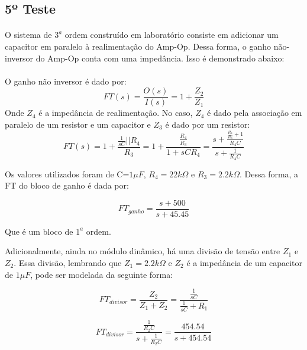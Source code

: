 \subsection{5º Teste}
\paragraph{}
O sistema de $3^a$ ordem construído em laboratório consiste em adicionar um capacitor em paralelo à realimentação do Amp-Op. Dessa forma, o ganho não-inversor do Amp-Op conta com uma impedância. Isso é demonstrado abaixo:

\paragraph{} O ganho não inversor é dado por:\\
\begin{equation}
FT(s)=\frac{O(s)}{I(s)}=1+\frac{Z_2}{Z_1}
\end{equation}
Onde $Z_4$ é a impedância de realimentação.
No caso, $Z_4$ é dado pela associação em paralelo de um resistor e um capacitor e $Z_3$ é dado por um resistor:
\begin{equation}
FT(s)=1+\frac{\frac{1}{sC}||R_4}{R_3}=1+\frac{\frac{R_4}{R_3}}{1+sCR_4}=\frac{s+\frac{\frac{R_4}{R_3}+1}{R_4C}}{s+\frac{1}{R_4C}}
\end{equation}

Os valores utilizados foram de C=$1\mu F$, $R_4=22k\Omega$ e $R_3=2.2k\Omega$. Dessa forma, a FT do bloco de ganho é dada por:

\begin{equation}
FT_{ganho}=\frac{s+500}{s+45.45}
\end{equation}{}

Que é um bloco de $1^a$ ordem.

Adicionalmente, ainda no módulo dinâmico, há uma divisão de tensão entre $Z_1$ e $Z_2$. Essa divisão, lembrando que $Z_1=2.2k\Omega$ e $Z_2$ é a impedância de um capacitor de $1\mu F$, pode ser modelada da seguinte forma:

\begin{equation}
FT_{divisor}=\frac{Z_2}{Z_1+Z_2}=\frac{\frac{1}{sC}}{\frac{1}{sC}+R_1}
\end{equation}

\begin{equation}
FT_{divisor}=\frac{\frac{1}{R_2C}}{s+\frac{1}{R_2C}}=\frac{454.54}{s+454.54}
\end{equation}

